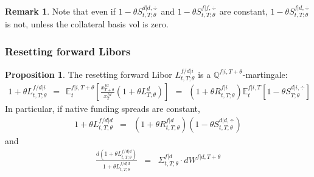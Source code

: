 \documentclass[11pt,english]{amsart}
\newcommand{\EE}{\mathbb{E}}
\newcommand{\QQ}{\mathbb{Q}}
\theoremstyle{definition}
\newtheorem{prop}{Proposition}
\newtheorem{rema}{Remark}
\begin{document}
\begin{rema}
Note that even if $1 - \theta S^{d|d,\div}_{t,T;\theta}$ and $1 - \theta S^{f|f,\div}_{t,T;\theta}$ are constant,  $1 - \theta S^{f|d,\div}_{t,T;\theta}$ is not, unless the collateral basis vol is zero.
\end{rema}




\subsubsection{Resetting forward Libors}



\begin{prop}
The resetting forward Libor $L^{f/d|i}_{t,T;\theta} $ is a $\QQ^{f|i,T+\theta}$-martingale:
\begin{eqnarray}
   1 + \theta L^{f/d|i}_{t,T;\theta} 
   ~~=~~ \EE^{f|i,T+\theta}_t\left[ \frac{x^{fd}_{T+\theta}}{x^{fd}_{T}} (1+\theta L^{d}_{T;\theta}) \right]  %
   ~~=~~  (1+\theta R^{f|i}_{t,T;\theta})  \EE^{f|i,T}_t\left[ 1-\theta S^{d|i,\div}_{T;\theta} \right]  
\end{eqnarray} 
In particular, if native funding spreads are constant, 
\begin{eqnarray}
   1 + \theta L^{f/d|d}_{t,T;\theta} 
   &=&  (1+\theta R^{f|d}_{t,T;\theta}) ( 1-\theta S^{d|d,\div}_{t,T;\theta} )
\end{eqnarray} 
and 
\begin{eqnarray}
   \frac{d(1 + \theta L^{f/d|d}_{t,T;\theta})}{1 + \theta L^{f/d|d}_{t,T;\theta} }
   &=&  \Sigma^{f|d}_{t,T;\theta}\cdot  dW^{f|d,T+\theta}
\end{eqnarray} 
\end{prop}
\end{document}
